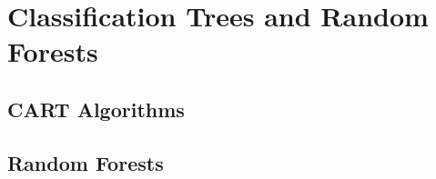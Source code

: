 \section{Classification Trees and Random Forests}

\begin{sectionbox}
	\subsection{CART Algorithms}
	
\end{sectionbox}

\begin{sectionbox}
	\subsection{Random Forests}	
	
\end{sectionbox}
